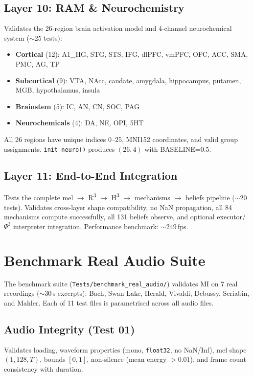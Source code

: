 \documentclass[10pt,twocolumn]{article}
\newcommand{\Rthree}{R\textsuperscript{3}}
\newcommand{\Hthree}{H\textsuperscript{3}}
\newcommand{\PsiThree}{\ensuremath{\Psi^{3}}}
\begin{document}
\subsection{Layer 10: RAM \& Neurochemistry}

Validates the 26-region brain activation model and 4-channel neurochemical system ($\sim$25 tests):
\begin{itemize}[nosep,leftmargin=*]
  \item \textbf{Cortical} (12): A1\_HG, STG, STS, IFG, dlPFC, vmPFC, OFC, ACC, SMA, PMC, AG, TP
  \item \textbf{Subcortical} (9): VTA, NAcc, caudate, amygdala, hippocampus, putamen, MGB, hypothalamus, insula
  \item \textbf{Brainstem} (5): IC, AN, CN, SOC, PAG
  \item \textbf{Neurochemicals} (4): DA, NE, OPI, 5HT
\end{itemize}

All 26 regions have unique indices 0--25, MNI152 coordinates, and valid group assignments. \texttt{init\_neuro()} produces $(26,4)$ with BASELINE=0.5.

\subsection{Layer 11: End-to-End Integration}

Tests the complete mel $\to$ \Rthree{} $\to$ \Hthree{} $\to$ mechanisms $\to$ beliefs pipeline ($\sim$20 tests). Validates cross-layer shape compatibility, no NaN propagation, all 84 mechanisms compute successfully, all 131 beliefs observe, and optional executor/\PsiThree{} interpreter integration. Performance benchmark: $\sim$249\,fps.

\section{Benchmark Real Audio Suite}
\label{sec:benchmark}

The benchmark suite (\texttt{Tests/benchmark\_real\_audio/}) validates MI on 7 real recordings ($\sim$30\,s excerpts): Bach, Swan Lake, Herald, Vivaldi, Debussy, Scriabin, and Mahler. Each of 11 test files is parametrised across all audio files.

\subsection{Audio Integrity (Test 01)}
Validates loading, waveform properties (mono, \texttt{float32}, no NaN/Inf), mel shape $(1,128,T)$, bounds $[0,1]$, non-silence (mean energy $> 0.01$), and frame count consistency with duration.
\end{document}
